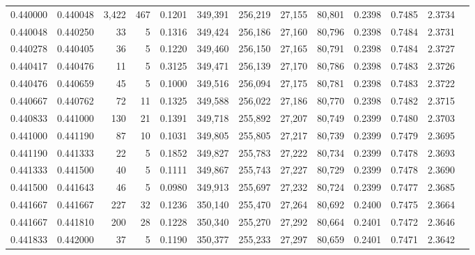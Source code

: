 \begin{tabular}{rrrrrrrrrrrrr}
0.440000 & 0.440048 & 3,422 & 467 &                                     0.1201 & 349,391 & 256,219 &  27,155 &  80,801 & 0.2398 & 0.7485 & 2.3734 \\
0.440048 & 0.440250 &    33 &   5 &                                     0.1316 & 349,424 & 256,186 &  27,160 &  80,796 & 0.2398 & 0.7484 & 2.3731 \\
0.440278 & 0.440405 &    36 &   5 &                                     0.1220 & 349,460 & 256,150 &  27,165 &  80,791 & 0.2398 & 0.7484 & 2.3727 \\
0.440417 & 0.440476 &    11 &   5 &                                     0.3125 & 349,471 & 256,139 &  27,170 &  80,786 & 0.2398 & 0.7483 & 2.3726 \\
0.440476 & 0.440659 &    45 &   5 &                                     0.1000 & 349,516 & 256,094 &  27,175 &  80,781 & 0.2398 & 0.7483 & 2.3722 \\
0.440667 & 0.440762 &    72 &  11 &                                     0.1325 & 349,588 & 256,022 &  27,186 &  80,770 & 0.2398 & 0.7482 & 2.3715 \\
0.440833 & 0.441000 &   130 &  21 &                                     0.1391 & 349,718 & 255,892 &  27,207 &  80,749 & 0.2399 & 0.7480 & 2.3703 \\
0.441000 & 0.441190 &    87 &  10 &                                     0.1031 & 349,805 & 255,805 &  27,217 &  80,739 & 0.2399 & 0.7479 & 2.3695 \\
0.441190 & 0.441333 &    22 &   5 &                                     0.1852 & 349,827 & 255,783 &  27,222 &  80,734 & 0.2399 & 0.7478 & 2.3693 \\
0.441333 & 0.441500 &    40 &   5 &                                     0.1111 & 349,867 & 255,743 &  27,227 &  80,729 & 0.2399 & 0.7478 & 2.3690 \\
0.441500 & 0.441643 &    46 &   5 &                                     0.0980 & 349,913 & 255,697 &  27,232 &  80,724 & 0.2399 & 0.7477 & 2.3685 \\
0.441667 & 0.441667 &   227 &  32 &                                     0.1236 & 350,140 & 255,470 &  27,264 &  80,692 & 0.2400 & 0.7475 & 2.3664 \\
0.441667 & 0.441810 &   200 &  28 &                                     0.1228 & 350,340 & 255,270 &  27,292 &  80,664 & 0.2401 & 0.7472 & 2.3646 \\
0.441833 & 0.442000 &    37 &   5 &                                     0.1190 & 350,377 & 255,233 &  27,297 &  80,659 & 0.2401 & 0.7471 & 2.3642 \\

\end{tabular}
